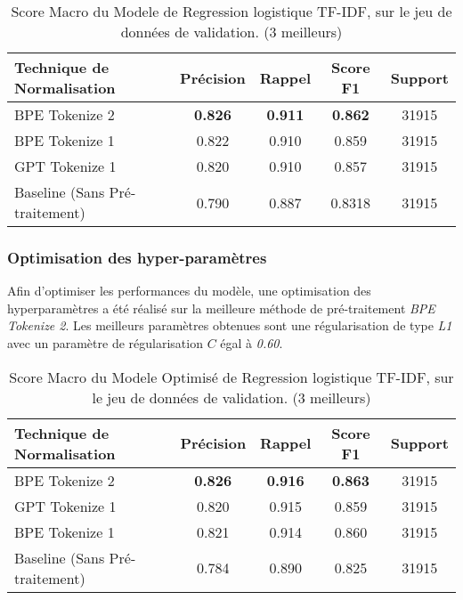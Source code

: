 \begin{table}[ht]
    \centering
    \caption{Score Macro du Modele de Regression logistique TF-IDF, sur le jeu de données de validation. (3 meilleurs)}
    \begin{tabular}{lcccc}
    \hline
    \textbf{Technique de Normalisation} & \textbf{Précision} & \textbf{Rappel} & \textbf{Score F1} & \textbf{Support} \\ \hline
    BPE Tokenize 2                       & \textbf{0.826}         & \textbf{0.911}         & \textbf{0.862}             & 31915            \\
    BPE Tokenize 1                           & 0.822              & 0.910                   & 0.859             & 31915            \\
    GPT Tokenize 1                              & 0.820              & 0.910                & 0.857             & 31915            \\ \hline
    Baseline (Sans Pré-traitement)                & 0.790              & 0.887           & 0.8318             & 31915            \\ \hline
    \end{tabular}
    \label{tab:results}
    \end{table}

\subsubsection{Optimisation des hyper-paramètres}
Afin d'optimiser les performances du modèle, une optimisation des hyperparamètres a été réalisé sur la meilleure méthode de pré-traitement \textit{BPE Tokenize 2}. 
Les meilleurs paramètres obtenues sont une régularisation de type \textit{L1} avec un paramètre de régularisation $C$ égal à \textit{0.60}.

\begin{table}[ht]
    \centering
    \caption{Score Macro du Modele Optimisé de Regression logistique TF-IDF, sur le jeu de données de validation. (3 meilleurs)}
    \begin{tabular}{lcccc}
    \hline
    \textbf{Technique de Normalisation} & \textbf{Précision} & \textbf{Rappel} & \textbf{Score F1} & \textbf{Support} \\ \hline
    BPE Tokenize 2                          & \textbf{0.826}              & \textbf{0.916}           & \textbf{0.863}             & 31915            \\
    GPT Tokenize 1                          & 0.820              & 0.915           & 0.859             & 31915            \\
    BPE Tokenize 1                           & 0.821              & 0.914           & 0.860             & 31915            \\ \hline
    Baseline (Sans Pré-traitement)             & 0.784             & 0.890           & 0.825             & 31915            \\ \hline
\end{tabular}
\label{tab:results}
\end{table}


